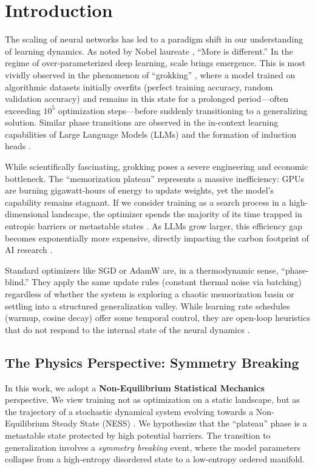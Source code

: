 \documentclass{article}
\theoremstyle{plain}
\theoremstyle{definition}
\theoremstyle{remark}
\begin{document}
\section{Introduction}
\label{sec:intro}

The scaling of neural networks has led to a paradigm shift in our understanding of learning dynamics. As noted by Nobel laureate \citet{anderson1972more}, ``More is different.'' In the regime of over-parameterized deep learning, scale brings emergence. This is most vividly observed in the phenomenon of ``grokking'' \cite{power2022grokking}, where a model trained on algorithmic datasets initially overfits (perfect training accuracy, random validation accuracy) and remains in this state for a prolonged period—often exceeding $10^5$ optimization steps—before suddenly transitioning to a generalizing solution. Similar phase transitions are observed in the in-context learning capabilities of Large Language Models (LLMs) \cite{kaplan2020scaling, liu2024omnigrok} and the formation of induction heads \cite{nanda2023progress}.

While scientifically fascinating, grokking poses a severe engineering and economic bottleneck. The ``memorization plateau'' represents a massive inefficiency: GPUs are burning gigawatt-hours of energy to update weights, yet the model's capability remains stagnant. If we consider training as a search process in a high-dimensional landscape, the optimizer spends the majority of its time trapped in entropic barriers or metastable states \cite{sohldickstein2015deep}. As LLMs grow larger, this efficiency gap becomes exponentially more expensive, directly impacting the carbon footprint of AI research \cite{hoffmann2022training}.

Standard optimizers like SGD or AdamW \cite{loshchilov2019decoupled} are, in a thermodynamic sense, ``phase-blind.'' They apply the same update rules (constant thermal noise via batching) regardless of whether the system is exploring a chaotic memorization basin or settling into a structured generalization valley. While learning rate schedules (warmup, cosine decay) offer some temporal control, they are open-loop heuristics that do not respond to the internal state of the neural dynamics \cite{thilak2022slingshot}.

\subsection{The Physics Perspective: Symmetry Breaking}
In this work, we adopt a \textbf{Non-Equilibrium Statistical Mechanics} perspective. We view training not as optimization on a static landscape, but as the trajectory of a stochastic dynamical system evolving towards a Non-Equilibrium Steady State (NESS) \cite{alemi2024thermodynamics, shwartz2017opening}. We hypothesize that the ``plateau'' phase is a metastable state protected by high potential barriers. The transition to generalization involves a \textit{symmetry breaking} event, where the model parameters collapse from a high-entropy disordered state to a low-entropy ordered manifold.
\end{document}
